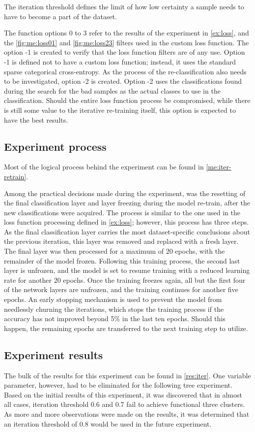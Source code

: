 The iteration threshold defines the limit of how low certainty a sample needs to have to become a part of the dataset.

The function options 0 to 3 refer to the results of the experiment in \cref{ex:loss}, and the \cref{fig:me:loss01} and \cref{fig:me:loss23} filters used in the custom loss function.
The option -1 is created to verify that the loss function filters are of any use.
Option -1 is defined not to have a custom loss function; instead, it uses the standard sparse categorical cross-entropy.
As the process of the re-classification also needs to be investigated, option -2 is created.
Option -2 uses the classifications found during the search for the bad samples as the actual classes to use in the classification.
Should the entire loss function process be compromised, while there is still some value to the iterative re-training itself, this option is expected to have the best results.

\subsection{Experiment process}
Most of the logical process behind the experiment can be found in \cref{me:iter-retrain}.

Among the practical decisions made during the experiment, was the resetting of the final classification layer and layer freezing during the model re-train, after the new classifications were acquired.
The process is similar to the one used in the loss function processing defined in \cref{ex:loss}; however, this process has three steps.
As the final classification layer carries the most dataset-specific conclusions about the previous iteration, this layer was removed and replaced with a fresh layer.
The final layer was then processed for a maximum of 20 epochs, with the remainder of the model frozen.
Following this training process, the second last layer is unfrozen, and the model is set to resume training with a reduced learning rate for another 20 epochs.
Once the training freezes again, all but the first four of the network layers are unfrozen, and the training continues for another five epochs.
An early stopping mechanism is used to prevent the model from needlessly churning the iterations, which stops the training process if the accuracy has not improved beyond 5\% in the last ten epochs.
Should this happen, the remaining epochs are transferred to the next training step to utilize.



\subsection{Experiment results}
The bulk of the results for this experiment can be found in \cref{res:iter}.
One variable parameter, however, had to be eliminated for the following tree experiment.
Based on the initial results of this experiment, it was discovered that in almost all cases, iteration threshold 0.6 and 0.7 fail to achieve functional three clusters.
As more and more observations were made on the results, it was determined that an iteration threshold of 0.8 would be used in the future experiment.

